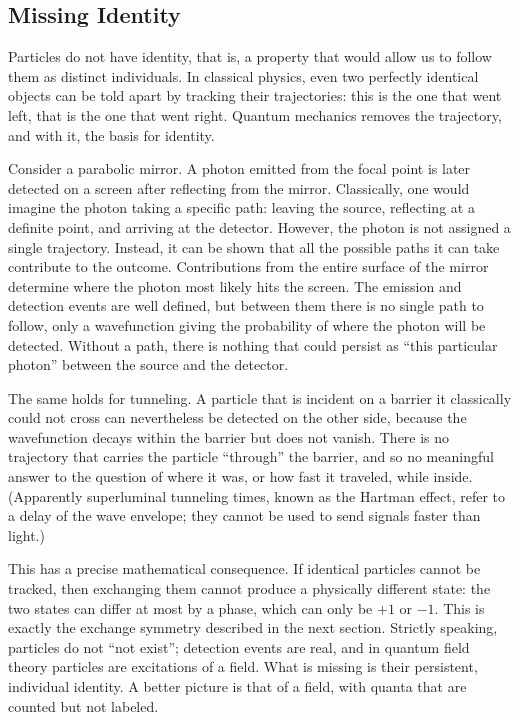 \subsection*{Missing Identity}

Particles do not have identity, that is, a property that would allow us to follow them as distinct individuals.  
In classical physics, even two perfectly identical objects can be told apart by tracking their trajectories: this is the one that went left, that is the one that went right.
Quantum mechanics removes the trajectory, and with it, the basis for identity.

Consider a parabolic mirror. A photon emitted from the focal point is later detected on a screen after reflecting from the mirror. Classically, 
one would imagine the photon taking a specific path: leaving the source, reflecting at a definite point, and arriving at the detector.
However, the photon is not assigned a single trajectory. Instead, it can be shown that all the possible paths it can take contribute to the outcome. 
Contributions from the entire surface of the mirror determine where the photon most likely hits the screen. The emission and detection events are well defined, 
but between them there is no single path to follow, only a wavefunction giving the probability of where the photon will be detected. 
Without a path, there is nothing that could persist as ``this particular photon'' between the source and the detector.

The same holds for tunneling. A particle that is incident on a barrier it classically could not cross can nevertheless be detected on the other side, because the wavefunction decays within the barrier but does not vanish. 
There is no trajectory that carries the particle ``through'' the barrier, and so no meaningful answer to the question of where it was, or how fast it traveled, while inside. 
(Apparently superluminal tunneling times, known as the Hartman effect, refer to a delay of the wave envelope; they cannot be used to send signals faster than light.)

This has a precise mathematical consequence. If identical particles cannot be tracked, then exchanging them cannot produce a physically different state: the two states can differ at most by a phase, which can only be $+1$ or $-1$. This is exactly the exchange symmetry described in the next section. 
Strictly speaking, particles do not ``not exist''; detection events are real, and in quantum field theory particles are excitations of a field. What is missing is their persistent, individual identity. 
A better picture is that of a field, with quanta that are counted but not labeled.


